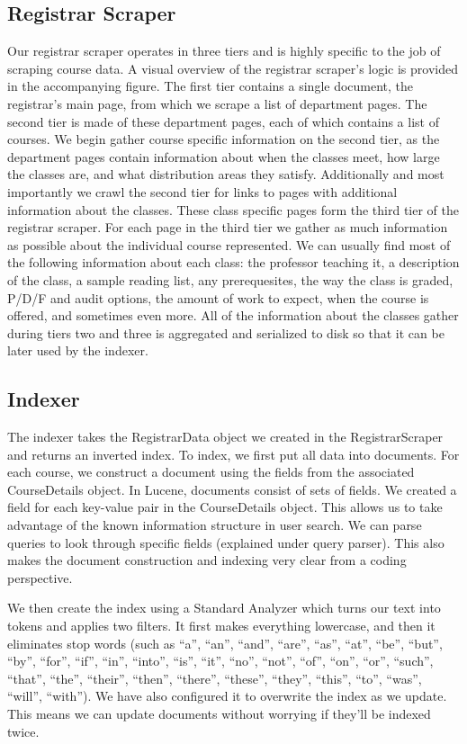 \documentclass[12pt,letterpaper]{article}
\begin{document}
\subsection{Registrar Scraper}

Our registrar scraper operates in three tiers and is highly specific to the job of scraping course data. A visual overview of the registrar scraper's logic is provided in the accompanying figure. The first tier contains a single document, the registrar's main page, from which we scrape a list of department pages. The second tier is made of these department pages, each of which contains a list of courses. We begin gather course specific information on the second tier, as the department pages contain information about when the classes meet, how large the classes are, and what distribution areas they satisfy. Additionally and most importantly we crawl the second tier for links to pages with additional information about the classes. These class specific pages form the third tier of the registrar scraper. For each page in the third tier we gather as much information as possible about the individual course represented. We can usually find most of the following information about each class: the professor teaching it, a description of the class, a sample reading list, any prerequesites, the way the class is graded, P/D/F and audit options, the amount of work to expect, when the course is offered, and sometimes even more. All of the information about the classes gather during tiers two and three is aggregated and serialized to disk so that it can be later used by the indexer.

\subsection{Indexer}
	
The indexer takes the RegistrarData object we created in the RegistrarScraper and returns an inverted index. To index, we first put all data into documents. For each course, we construct a document using the fields from the associated CourseDetails object. In Lucene, documents consist of sets of fields. We created a field for each key-value pair in the CourseDetails object. This allows us to take advantage of the known information structure in user search. We can parse queries to look through specific fields (explained under query parser). This also makes the document construction and indexing very clear from a coding perspective. 

We then create the index using a Standard Analyzer which turns our text into tokens and applies two filters. It first makes everything lowercase, and then it eliminates stop words (such as ``a'', ``an'',  ``and'', ``are'', ``as'', ``at'', ``be'', ``but'', ``by'', ``for'', ``if'', ``in'', ``into'', ``is'', ``it'', ``no'', ``not'', ``of'', ``on'', ``or'', ``such'', ``that'', ``the'', ``their'', ``then'', ``there'', ``these'', ``they'', ``this'', ``to'', ``was'', ``will'', ``with''). We have also configured it to overwrite the index as we update. This means we can update documents without worrying if they'll be indexed twice. 
	
\end{document}
